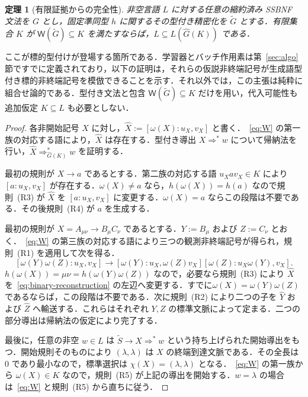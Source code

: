 \documentclass[11pt,a4paper]{ltjsarticle}
\newtheorem{theorem}{定理}[section]
\theoremstyle{remark}
\theoremstyle{plain}
\newcommand{\WitnessSet}{\mathsf{W}}
\begin{document}
\begin{theorem}[有限証拠からの完全性]\label{thm:complete}
非空言語 $L$ に対する任意の縮約済み SSBNF 文法を $G$ とし，固定準同型 $h$ に関するその型付き精密化を $\widetilde G$ とする．有限集合 $K$ が $\WitnessSet(\widetilde G)\subseteq K$ を満たすならば，$L\subseteq L(\widehat G(K))$ である．
\end{theorem}

ここが標的型付けが登場する箇所である．学習器とバッチ作用素は第~\ref{sec:algo}節ですでに定義されており，以下の証明は，それらの仮説非終端記号が生成語型付き標的非終端記号を模倣できることを示す．それ以外では，この主張は純粋に組合せ論的である．型付き文法と包含 $\WitnessSet(\widetilde G)\subseteq K$ だけを用い，代入可能性も追加仮定 $K\subseteq L$ も必要としない．

\begin{proof}
各非開始記号 $X$ に対し，$\widehat X:=[\omega(X):u_X,v_X]$ と書く．~\eqref{eq:W} の第一族の対応する語により，$\widehat X$ は存在する．型付き導出 $X\Rightarrow^*w$ について帰納法を行い，$\widehat X\Rightarrow_{\widehat G(K)}^*w$ を証明する．

最初の規則が $X\to a$ であるとする．第二族の対応する語 $u_Xav_X\in K$ により $[a:u_X,v_X]$ が存在する．$\omega(X)\ne a$ なら，$h(\omega(X))=h(a)$ なので規則~(R3) が $\widehat X$ を $[a:u_X,v_X]$ に変更する．$\omega(X)=a$ ならこの段階は不要である．その後規則~(R4) が $a$ を生成する．

最初の規則が $X=A_{\mu\nu}\to B_\mu C_\nu$ であるとする．$Y:=B_\mu$ および $Z:=C_\nu$ とおく．~\eqref{eq:W} の第三族の対応する語により三つの観測非終端記号が得られ，規則~(R1) を適用して次を得る．
\begin{equation}\label{eq:binary-reconstruction}
 [\omega(Y)\omega(Z):u_X,v_X]
 \to[\omega(Y):u_X,\omega(Z)v_X]
      [\omega(Z):u_X\omega(Y),v_X].
\end{equation}
$h(\omega(X))=\mu\nu=h(\omega(Y)\omega(Z))$ なので，必要なら規則~(R3) により $\widehat X$ を~\eqref{eq:binary-reconstruction} の左辺へ変更する．すでに$\omega(X)=\omega(Y)\omega(Z)$であるならば，この段階は不要である．次に規則~(R2) により二つの子を $\widehat Y$ および $\widehat Z$ へ輸送する．これらはそれぞれ $Y,Z$ の標準文脈によって定まる．二つの部分導出は帰納法の仮定により完了する．

最後に，任意の非空 $w\in L$ は $\widetilde S\to X\Rightarrow^*w$ という持ち上げられた開始導出をもつ．開始規則そのものにより $(\lambda,\lambda)$ は $X$ の終端到達文脈である．その全長は $0$ であり最小なので，標準選択は $\chi(X)=(\lambda,\lambda)$ となる．~\eqref{eq:W} の第一族から $\omega(X)\in K$ なので，規則~(R5) が上記の導出を開始する．$w=\lambda$ の場合は~\eqref{eq:W} と規則~(R5) から直ちに従う．
\end{proof}
\end{document}
